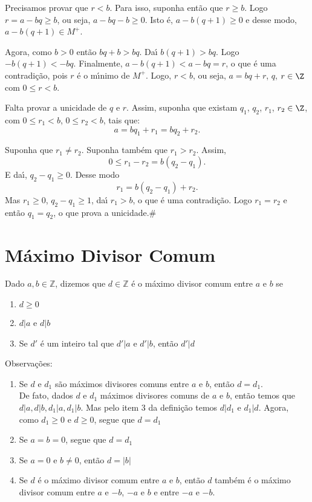 Precisamos provar que $r < b$. Para isso, suponha ent{\~a}o que $r \geq b$. Logo $r = a-bq \geq b$, ou seja, $a - bq - b\geq 0$. Isto \'e, $a - b(q+1) \geq 0$ e desse modo, $a - b(q+1) \in M^{+}$.

Agora, como $b > 0$ ent\~ao $bq + b > bq$. Da{\'\i} $b(q+1) > bq$. Logo $-b(q+1) < -bq$. Finalmente, $a - b(q + 1) < a - bq = r$, o que {\'e} uma contradi{\c c}{\~a}o, pois $r$ {\'e} o m{\'\i}nimo de $M^+$. Logo, $r < b$, ou seja, $a = bq + r$, $q$, $r \in \Z$ com $0 \leq r < b$.

Falta provar a unicidade de $q$ e $r$. Assim, suponha que existam $q_1$, $q_2$, $r_1$, $r_2 \in \Z$, com $0 \leq r_1 < b$, $0 \leq r_2 < b$, tais que:
\[
	a = bq_1 + r_1 = bq_2 + r_2.
\]

Suponha que $r_1 \ne r_2$. Suponha tamb{\'e}m que $r_1 > r_2$. Assim,
\[
	0 \leq r_1 - r_2 = b(q_2 - q_1).
\]
E da{\'\i}, $q_2 - q_1 \geq 0$.
Desse modo
\[
	r_1 = b(q_2 - q_1) + r_2.
\]
Mas $r_1 \geq 0$, $q_2 - q_1 \geq 1$, da{\'\i} $r_1 > b$, o que {\'e} uma contradi{\c c}{\~a}o. Logo $r_1 = r_2$ e ent{\~a}o $q_1 = q_2$, o que prova a unicidade.\#

\section{M{\'a}ximo Divisor Comum}

\begin{definicao} Dado $a,b\in\mathbb{Z}$, dizemos que $d\in\mathbb{Z}$ {\'e} o m{\'a}ximo divisor comum entre $a$ e $b$ se
\begin{enumerate}
\item $d\geq 0$
\item $d|a$ e $d|b$
\item Se $d'$ {\'e} um inteiro tal que $d'|a$ e $d'|b$, ent{\~a}o $d'|d$ %
\end{enumerate}
\end{definicao}

Observa{\c c}{\~o}es:
\begin{enumerate}
\item Se $d$ e $d_{1}$ s{\~a}o m{\'a}ximos divisores comuns entre $a$ e $b$, ent{\~a}o $d=d_{1}$.\\

De fato, dados $d$ e $d_{1}$ m{\'a}ximos divisores comuns de $a$ e $b$, ent{\~a}o temos que $d|a,d|b,d_{1}|a,d_{1}|b$. Mas pelo item 3 da defini{\c c}{\~a}o temos $d|d_{1}$ e $d_{1}|d$. Agora, como $d_{1}\geq 0$ e $d\geq 0$, segue que $d=d_{1}$
\item Se $a=b=0$, segue que $d=d_{1}$ %
\item Se $a=0$ e $b\neq 0$, ent{\~a}o $d=|b|$
\item Se $d$ {\'e} o m{\'a}ximo divisor comum entre $a$ e $b$, ent{\~a}o $d$ tamb{\'e}m {\'e} o m{\'a}ximo divisor comum entre $a$ e $-b$, $-a$ e $b$ e entre $-a$ e $-b$.
\end{enumerate}

